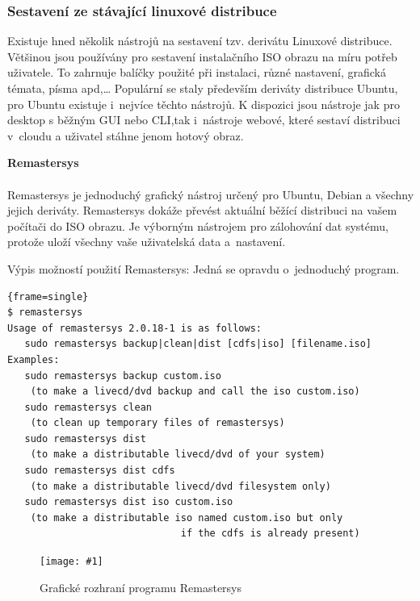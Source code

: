 \documentclass[a4paper,12pt]{article}
\newcommand{\nadpis}[1]{%
	\vspace{4 mm}
	\textbf{#1}\\
	\vspace{4 mm}
	}
\newcommand{\obr}[3]{%
	\begin{figure}[h]
	\center\texttt{[image: \#1]}
	\caption{#3}
	\end{figure}
	}
\newenvironment{codeframe}{%
  \begin{Sbox} 
    \begin{minipage} 
      {\columnwidth-\leftmargin-\rightmargin-2\fboxsep-2\fboxrule-4pt} 
}{%

  \end{minipage} 
  \end{Sbox} 
  \begin{center} 
    \fcolorbox{black}{codeback}{\TheSbox} 
  \end{center} 
}
\begin{document}
\subsubsection{Sestavení ze stávající linuxové distribuce} \label{sec:tvorbaDistribuce}
Existuje hned několik nástrojů na sestavení tzv. derivátu Linuxové distribuce. Většinou jsou používány pro sestavení instalačního ISO obrazu na míru potřeb uživatele. To zahrnuje balíčky použité při instalaci, různé nastavení, grafická témata, písma apd,… Populární se staly především deriváty distribuce Ubuntu, pro Ubuntu existuje i~nejvíce těchto nástrojů. K dispozici jsou nástroje jak pro desktop s běžným GUI nebo CLI,tak i~nástroje webové, které sestaví distribuci v~cloudu a uživatel stáhne jenom hotový obraz.

\nadpis{Remastersys}\\
Remastersys je jednoduchý grafický nástroj určený pro Ubuntu, Debian a všechny jejich deriváty. Remastersys dokáže převést aktuální běžící distribuci na vašem počítači do ISO obrazu. Je výborným nástrojem pro zálohování dat systému, protože uloží všechny vaše uživatelská data a~nastavení.\cite{Linux_Build}

Výpis možností použití Remastersys: Jedná se opravdu o~jednoduchý program.
    \begin{codeframe} 
\begin{Verbatim}{frame=single} 
$ remastersys
Usage of remastersys 2.0.18-1 is as follows:
   sudo remastersys backup|clean|dist [cdfs|iso] [filename.iso]
Examples:
   sudo remastersys backup custom.iso
    (to make a livecd/dvd backup and call the iso custom.iso)
   sudo remastersys clean
    (to clean up temporary files of remastersys)
   sudo remastersys dist
    (to make a distributable livecd/dvd of your system)
   sudo remastersys dist cdfs
    (to make a distributable livecd/dvd filesystem only)
   sudo remastersys dist iso custom.iso
    (to make a distributable iso named custom.iso but only
                              if the cdfs is already present)
\end{Verbatim} 
    \end{codeframe} 
\begin{center}
\obr{./img/screens/remastersys.png}{0.5}{Grafické rozhraní programu Remastersys}


\end{center}

\end{document}
